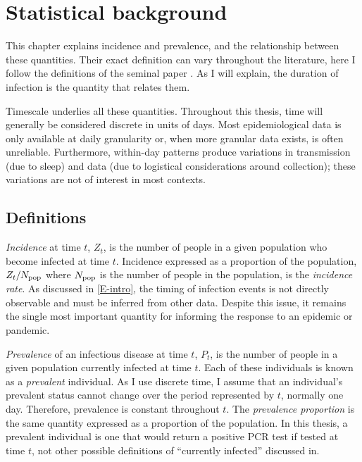\documentclass[thesis.tex]{subfiles}
\begin{document}
\ifSubfilesClassLoaded{
  \setcounter{chapter}{2}
}
\chapter{Statistical background} \label{inc-prev}

This chapter explains incidence and prevalence, and the relationship between these quantities.
Their exact definition can vary throughout the literature, here I follow the definitions of the seminal paper \textcite{freemanPrevalence}.
As I will explain, the duration of infection is the quantity that relates them.

Timescale underlies all these quantities.
Throughout this thesis, time will generally be considered discrete in units of days.
Most epidemiological data is only available at daily granularity or, when more granular data exists, is often unreliable.
Furthermore, within-day patterns produce variations in transmission (\eg due to sleep) and data (\eg due to logistical considerations around collection); these variations are not of interest in most contexts.

\section{Definitions}

\emph{Incidence} at time $t$, $Z_t$, is the number of people in a given population who become infected at time $t$.
Incidence expressed as a proportion of the population, $Z_t/N_\text{pop}$ where $N_\text{pop}$ is the number of people in the population, is the \emph{incidence rate}.
As discussed in \cref{E-intro}, the timing of infection events is not directly observable and must be inferred from other data.
Despite this issue, it remains the single most important quantity for informing the response to an epidemic or pandemic.

\emph{Prevalence} of an infectious disease at time $t$, $P_t$, is the number of people in a given population currently infected at time $t$.
Each of these individuals is known as a \emph{prevalent} individual.
As I use discrete time, I assume that an individual's prevalent status cannot change over the period represented by $t$, normally one day.
Therefore, prevalence is constant throughout $t$.
The \emph{prevalence proportion} is the same quantity expressed as a proportion of the population.
In this thesis, a prevalent individual is one that would return a positive PCR test if tested at time $t$, not other possible definitions of ``currently infected'' discussed in.
\end{document}
